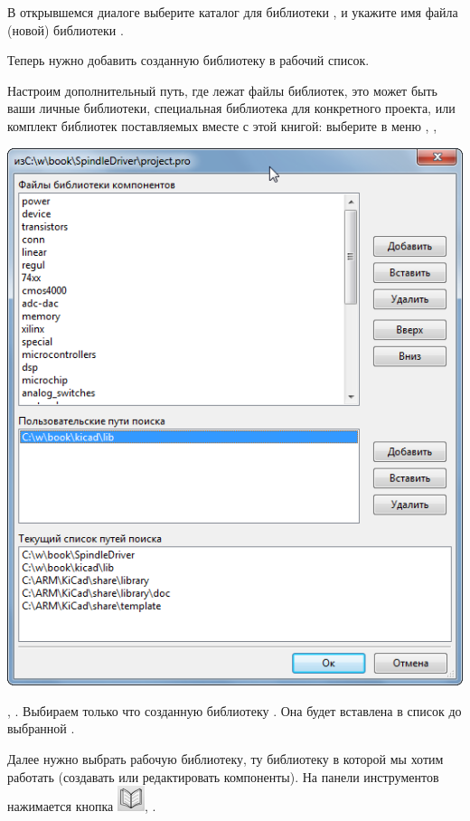 В открывшемся диалоге выберите каталог для библиотеки
, и укажите имя файла (новой) библиотеки
. 

\bigskip
Теперь нужно добавить созданную библиотеку в рабочий список.
\bigskip

Настроим дополнительный путь, где лежат файлы библиотек, это может быть ваши
личные библиотеки, специальная библиотека для конкретного проекта, или
комплект библиотек поставляемых вместе с этой книгой:
выберите в меню , 
,

\includegraphics[height=0.5\textheight]{kicad/lib25.png}

,
.
Выбираем только что созданную библиотеку .
Она будет вставлена в список до выбранной .

\bigskip
Далее нужно выбрать рабочую библиотеку, ту библиотеку в которой мы
хотим работать (создавать или редактировать компоненты).
На панели инструментов нажимается кнопка
\includegraphics[height=2em]{kicad/lib24.png},
.


